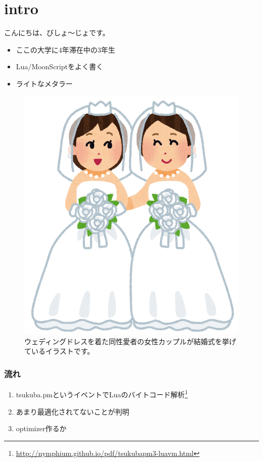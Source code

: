 \section{intro}
\begin{frame}
	こんにちは、びしょ〜じょです。
	\begin{itemize}
		\item ここの大学に4年滞在中の3年生
		\item {\alert{Lua/MoonScript}をよく書く}
		\item ライトなメタラー
	\end{itemize}
	\begin{figure}[H]
		\centering
		\includegraphics[height=.3\textheight]{img/dousei_wedding_women.png}
		\caption{ウェディングドレスを着た同性愛者の女性カップルが結婚式を挙げているイラストです。}
	\end{figure}
\end{frame}
\begin{frame}
	\frametitle{流れ}
	\begin{enumerate}
		\item tsukuba.pmというイベントでLuaのバイトコード解析\footnote{\url{http://nymphium.github.io/pdf/tsukubapm3-luavm.html}}
		\item あまり最適化されてないことが判明
		\item \alert{optimizer作るか}
	\end{enumerate}
\end{frame}
